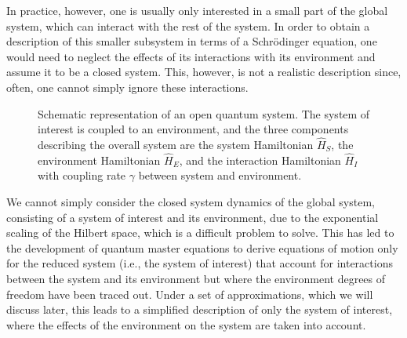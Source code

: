 In practice, however, one is usually only interested in a small part of the global system, which can interact with the rest of the system. In order to obtain a description of this smaller subsystem in terms of a Schr\"{o}dinger equation, one would need to neglect the effects of its interactions with its environment and assume it to be a closed system. This, however, is not a realistic description since, often, one cannot simply ignore these interactions.

\begin{figure}[h]
    \centering


    \caption{Schematic representation of an open quantum system. The system of interest is coupled to an environment, and the three components describing the overall system are the system Hamiltonian $\hat{H}_S$, the environment Hamiltonian $\hat{H}_E$, and the interaction Hamiltonian $\hat{H}_I$ with coupling rate $\gamma$ between system and environment.}
    \label{fig:Chapter2_Fig1}
\end{figure}

We cannot simply consider the closed system dynamics of the global system, consisting of a system of interest and its environment, due to the exponential scaling of the Hilbert space, which is a difficult problem to solve. This has led to the development of quantum master equations \cite{carmichael1993,breuer2002, manzano2020} to derive equations of motion only for the reduced system (i.e., the system of interest) that account for interactions between the system and its environment but where the environment degrees of freedom have been traced out. Under a set of approximations, which we will discuss later, this leads to a simplified description of only the system of interest, where the effects of the environment on the system are taken into account. 

